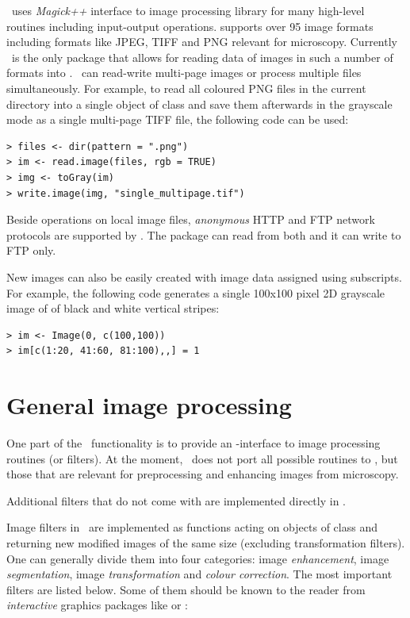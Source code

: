 \EBImage\ uses {\em Magick++} interface to  image processing library \citep{R:ImageMagick:1999} for many high-level routines including input-output operations.  supports over 95 image formats including formats like JPEG, TIFF and PNG relevant for microscopy. Currently \EBImage\ is the only \R{} package that allows for reading data of images in such a number of formats into \R{}. \EBImage\ can read-write multi-page images or process multiple files simultaneously. For example, to read all coloured PNG files in the current directory into a single object of class  and save them afterwards in the grayscale mode as a single multi-page TIFF file, the following code can be used:

\begin{verbatim}
> files <- dir(pattern = ".png")
> im <- read.image(files, rgb = TRUE)
> img <- toGray(im)
> write.image(img, "single_multipage.tif")
\end{verbatim}

Beside operations on local image files, {\em anonymous} HTTP and FTP network protocols are supported by \EBImage. The package can read from both and it can write to FTP only.

New images can also be easily created with image data assigned using subscripts. For example, the following code generates a single 100x100 pixel 2D grayscale image of of black and white vertical stripes:

\begin{verbatim}
> im <- Image(0, c(100,100))
> im[c(1:20, 41:60, 81:100),,] = 1
\end{verbatim}

\section*{General image processing}

One part of the \EBImage\ functionality is to provide an \R{}-interface to  image processing routines (or filters). At the moment, \EBImage\ does not port all possible  routines to \R{}, but those that are relevant for preprocessing and enhancing images from microscopy.

Additional filters that do not come with  are implemented directly in \EBImage.

Image filters in \EBImage\ are implemented as functions acting on objects of class  and returning new modified images of the same size (excluding transformation filters). One can generally divide them into four categories: image {\em enhancement}, image {\em segmentation}, image {\em transformation} and {\em colour correction}. The most important filters are listed below. Some of them should be known to the reader from {\em interactive} graphics packages like  or :

